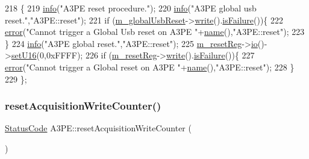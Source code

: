 \begin{DoxyCode}
218                \{
219         \hyperlink{classObject_a644fd329ea4cb85f54fa6846484b84a8}{info}(\textcolor{stringliteral}{"A3PE reset procedure."});
220     \hyperlink{classObject_a644fd329ea4cb85f54fa6846484b84a8}{info}(\textcolor{stringliteral}{"A3PE global usb reset."},\textcolor{stringliteral}{"A3PE::reset"});
221     \textcolor{keywordflow}{if} (\hyperlink{classA3PE_abd71e0c273f9e211e1a9302019129aff}{m\_globalUsbReset}->\hyperlink{classIOobject_a9f6984bc9f0fadcf800f1be2523ac744}{write}().\hyperlink{classStatusCode_a5dd22dc6eb2c52fc4cabc58f6dea2eb7}{isFailure}())\{
222       \hyperlink{classObject_a204a95f57818c0f811933917a30eff45}{error}(\textcolor{stringliteral}{"Cannot trigger a Global Usb reset on A3PE "}+\hyperlink{classObject_a300f4c05dd468c7bb8b3c968868443c1}{name}(),\textcolor{stringliteral}{"A3PE::reset"});
223     \}
224     \hyperlink{classObject_a644fd329ea4cb85f54fa6846484b84a8}{info}(\textcolor{stringliteral}{"A3PE global reset."},\textcolor{stringliteral}{"A3PE::reset"});
225         \hyperlink{classA3PE_ab4db5f00976e5095686f108c8febf702}{m\_resetReg}->\hyperlink{classIOobject_af04fb94137c3d86849f478ac5afab5d1}{io}()->\hyperlink{classIOdata_aa9ade5ce3944c8e2b831533b6f876caf}{setU16}(0,0xFFFF);
226     \textcolor{keywordflow}{if} (\hyperlink{classA3PE_ab4db5f00976e5095686f108c8febf702}{m\_resetReg}->\hyperlink{classIOobject_a9f6984bc9f0fadcf800f1be2523ac744}{write}().\hyperlink{classStatusCode_a5dd22dc6eb2c52fc4cabc58f6dea2eb7}{isFailure}())\{
227       \hyperlink{classObject_a204a95f57818c0f811933917a30eff45}{error}(\textcolor{stringliteral}{"Cannot trigger a Global reset on A3PE "}+\hyperlink{classObject_a300f4c05dd468c7bb8b3c968868443c1}{name}(),\textcolor{stringliteral}{"A3PE::reset"});
228     \}
229   \};
\end{DoxyCode}
\mbox{\label{classA3PE_a557ea9cfa97a03db1514af2fe8936df3}} 
\subsubsection{\texorpdfstring{reset\+Acquisition\+Write\+Counter()}{resetAcquisitionWriteCounter()}}
{\footnotesize\ttfamily \hyperlink{classStatusCode}{Status\+Code} A3\+P\+E\+::reset\+Acquisition\+Write\+Counter (\begin{DoxyParamCaption}{ }\end{DoxyParamCaption})}




